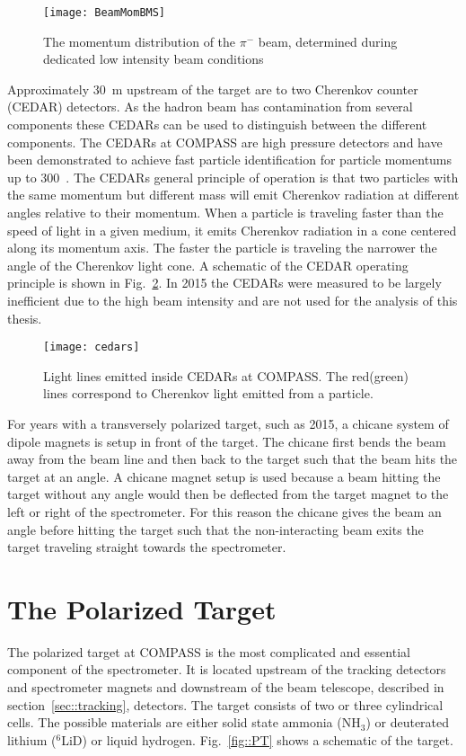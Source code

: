 \begin{figure}[h!t]
  \centering
  \texttt{[image: BeamMomBMS]}
  \caption{The momentum distribution of the $\pi^-$ beam, determined during
    dedicated low intensity beam conditions}
  \label{fig::BeamMomBMS}
\end{figure}

Approximately 30~m upstream of the target are to two Cherenkov counter (CEDAR)
detectors.  As the hadron beam has contamination from several components these
CEDARs can be used to distinguish between the different components.  The CEDARs
at COMPASS are high pressure detectors and have been demonstrated to achieve
fast particle identification for particle momentums up to 300~{\gvc}.  The
CEDARs general principle of operation is that two particles with the same
momentum but different mass will emit Cherenkov radiation at different angles
relative to their momentum.  When a particle is traveling faster than the speed
of light in a given medium, it emits Cherenkov radiation in a cone centered
along its momentum axis.  The faster the particle is traveling the narrower the
angle of the Cherenkov light cone.  A schematic of the CEDAR operating principle
is shown in Fig.~\ref{fig::cedars}.  In 2015 the CEDARs were measured to be
largely inefficient due to the high beam intensity and are not used for the
analysis of this thesis.

\begin{figure}[h!t]
  \centering
  \texttt{[image: cedars]}
  \caption{Light lines emitted inside CEDARs at COMPASS.  The
    red(green) lines correspond to Cherenkov light emitted from a particle.}
  \label{fig::cedars}
\end{figure}

For years with a transversely polarized target, such as 2015, a chicane system
of dipole magnets is setup in front of the target.  The chicane first bends the
beam away from the beam line and then back to the target such that the beam hits
the target at an angle.  A chicane magnet setup is used because a beam hitting
the target without any angle would then be deflected from the target magnet to
the left or right of the spectrometer.  For this reason the chicane gives the
beam an angle before hitting the target such that the non-interacting beam exits
the target traveling straight towards the spectrometer.


\section{The Polarized Target} \label{sec::polTarget}
The polarized target at COMPASS is the most complicated and essential component
of the spectrometer.  It is located upstream of the tracking detectors and
spectrometer magnets and downstream of the beam telescope, described in
section~\ref{sec::tracking}, detectors.  The target consists of two or three
cylindrical cells.  The possible materials are either solid state ammonia
(NH$_3$) or deuterated lithium ($^6$LiD) or liquid hydrogen. Fig.~\ref{fig::PT}
shows a schematic of the target.  \par

